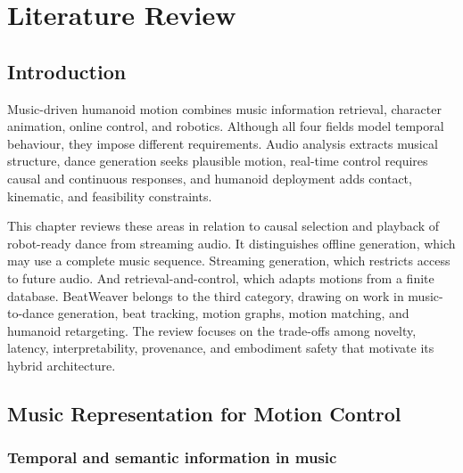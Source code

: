 
\chapter{Literature Review}
\label{chap:literature_review}

\section{Introduction}
\label{sec:lit_introduction}

Music-driven humanoid motion combines music information retrieval, character
animation, online control, and robotics. Although all four fields model
temporal behaviour, they impose different requirements. Audio analysis extracts
musical structure, dance generation seeks plausible motion, real-time control
requires causal and continuous responses, and humanoid deployment adds contact,
kinematic, and feasibility constraints.

This chapter reviews these areas in relation to causal selection and playback
of robot-ready dance from streaming audio. It distinguishes offline generation,
which may use a complete music sequence. Streaming generation, which restricts
access to future audio. And retrieval-and-control, which adapts motions from a
finite database. BeatWeaver belongs to the third category, drawing on work in
music-to-dance generation, beat tracking, motion graphs, motion matching, and
humanoid retargeting. The review focuses on the trade-offs among novelty,
latency, interpretability, provenance, and embodiment safety that motivate its
hybrid architecture.

\section{Music Representation for Motion Control}
\label{sec:lit_music_representation}

\subsection{Temporal and semantic information in music}
\label{subsec:lit_temporal_semantic}

